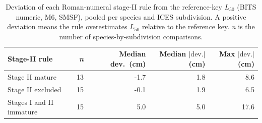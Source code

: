 \begin{table}[!h]
\centering
\caption{\label{tab:roman_deviation}Deviation of each Roman-numeral stage-II rule from the reference-key $L_{50}$ (BITS numeric, M6, SMSF), pooled per species and ICES subdivision. A positive deviation means the rule overestimates $L_{50}$ relative to the reference key. \textit{n} is the number of species-by-subdivision comparisons.}
\centering
\begin{tabular}[t]{lrrrr}
\toprule
Stage-II rule & \textit{n} & Median dev.\ (cm) & Median $|\text{dev.}|$ (cm) & Max $|\text{dev.}|$ (cm)\\
\midrule
Stage II mature & 13 & -1.7 & 1.8 & 8.6\\
Stage II excluded & 15 & -0.1 & 1.9 & 6.5\\
Stages I and II immature & 15 & 5.0 & 5.0 & 17.6\\
\bottomrule
\end{tabular}
\end{table}
